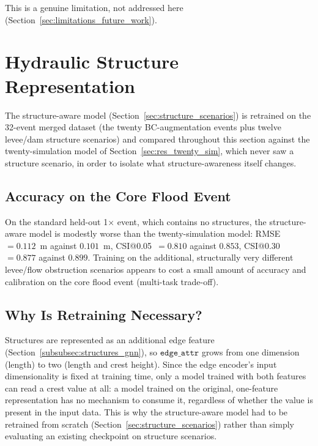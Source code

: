 \documentclass[12pt,a4paper]{report}
\begin{document}
{This is a genuine limitation, not addressed here (Section~\ref{sec:limitations_future_work}).

 
\section{Hydraulic Structure Representation}
\label{sec:res_structures}
 
The structure-aware model (Section~\ref{sec:structure_scenarios}) is retrained on the
32-event merged dataset (the twenty BC-augmentation events plus twelve levee/dam
structure scenarios) and compared throughout this section
against the twenty-simulation model of Section~\ref{sec:res_twenty_sim}, which never
saw a structure scenario, in order to isolate what structure-awareness itself changes.
 
\subsection{Accuracy on the Core Flood Event}
\label{subsec:res_structures_core_accuracy}
 
On the standard held-out 1$\times$ event, which contains no structures, the
structure-aware model is modestly worse than the twenty-simulation
model: RMSE~$=0.112$~m against $0.101$~m, CSI@0.05~$=0.810$ against $0.853$,
CSI@0.30~$=0.877$ against $0.899$. Training on the additional, structurally very different
levee/flow obstruction scenarios appears to cost a small amount of accuracy and calibration on the
core flood event (multi-task trade-off).
 
\subsection{Why Is Retraining Necessary?}
\label{subsec:res_structures_sanity}
 
Structures are represented as an additional edge feature (Section~\ref{subsubsec:structures_gnn}), so $\texttt{edge\_attr}$ grows from one dimension (length) to
two (length and crest height).
Since the edge encoder's input dimensionality is fixed at training time, only a model
trained with both features can read a crest value at all: a model trained on the
original, one-feature representation has no mechanism to consume it, regardless of
whether the value is present in the input data. This is why the structure-aware model
had to be retrained from scratch (Section~\ref{sec:structure_scenarios}) rather than
simply evaluating an existing checkpoint on structure scenarios.
 
}
\end{document}
